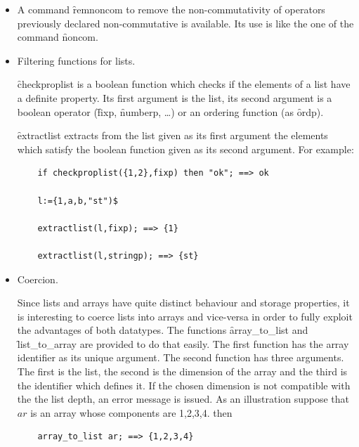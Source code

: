 \begin{itemize}
\hypertarget{operator:KORDERLIST}{}
\f{korderlist} is a zero argument function which displays the actual
ordering.
\begin{verbatim}
    korder x,y,z;

    korderlist; ==> (x,y,z)
\end{verbatim}

\item[iv.]
  \hypertarget{command:REMNONCOM}{}
  A command \f{remnoncom} to remove the non-commutativity of
operators previously declared non-commutative is available. Its use is like
the one of the command \f{noncom}.

\item[v.] Filtering functions for lists.

  \hypertarget{operator:CHECKPROPLIST}{}
\f{checkproplist}  is a  boolean function which checks if the
elements of a list have a definite property. Its first argument
is the list, its second argument is a boolean operator
(\f{fixp}, \f{numberp}, \ldots) or an ordering function (as \f{ordp}).

  \hypertarget{operator:EXTRACTLIST}{}
\f{extractlist} extracts from the list given as its first argument
the elements which satisfy the boolean function given as its second
argument. For example:
\begin{verbatim}
    if checkproplist({1,2},fixp) then "ok"; ==> ok

    l:={1,a,b,"st")$

    extractlist(l,fixp); ==> {1}

    extractlist(l,stringp); ==> {st}
\end{verbatim}
\item[vi.] Coercion.

\hypertarget{operator:ARRAY_TO_LIST}{}
\hypertarget{operator:LIST_TO_ARRAY}{}
Since lists and arrays have quite distinct behaviour and storage properties,
it is interesting to coerce lists into arrays and vice-versa in order to
fully exploit the advantages of both datatypes. The functions
\f{array\_to\_list} and \f{list\_to\_array} are provided to do that easily.
The first function has the array identifier as its unique argument.
The second
function has three arguments. The first is the list, the second is the
dimension of the array and the third is the identifier which defines it.
If the chosen dimension is not compatible with the
the list depth, an error message is issued.
As an illustration suppose that $ar$ is an array whose components are
1,2,3,4. then
\begin{verbatim}
    array_to_list ar; ==> {1,2,3,4}


\end{verbatim}
\end{itemize}
